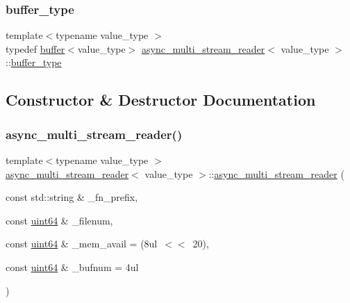 \subsubsection{\texorpdfstring{buffer\+\_\+type}{buffer\_type}}
{\footnotesize\ttfamily template$<$typename value\+\_\+type $>$ \\
typedef \hyperlink{structbuffer}{buffer}$<$value\+\_\+type$>$ \hyperlink{classasync__multi__stream__reader}{async\+\_\+multi\+\_\+stream\+\_\+reader}$<$ value\+\_\+type $>$\+::\hyperlink{classasync__multi__stream__reader_ad58ad834dc6d741a12be1fb442b8e5d6}{buffer\+\_\+type}\hspace{0.3cm}{\ttfamily [private]}}



\subsection{Constructor \& Destructor Documentation}
\mbox{\label{classasync__multi__stream__reader_af83e5faafb7612b51abc05e8edde52dd}} 
\subsubsection{\texorpdfstring{async\+\_\+multi\+\_\+stream\+\_\+reader()}{async\_multi\_stream\_reader()}}
{\footnotesize\ttfamily template$<$typename value\+\_\+type $>$ \\
\hyperlink{classasync__multi__stream__reader}{async\+\_\+multi\+\_\+stream\+\_\+reader}$<$ value\+\_\+type $>$\+::\hyperlink{classasync__multi__stream__reader}{async\+\_\+multi\+\_\+stream\+\_\+reader} (\begin{DoxyParamCaption}\item[{const std\+::string \&}]{\+\_\+fn\+\_\+prefix,  }\item[{const \hyperlink{types_8h_a60e8696a4678cd348e991a1f172e53f7}{uint64} \&}]{\+\_\+filenum,  }\item[{const \hyperlink{types_8h_a60e8696a4678cd348e991a1f172e53f7}{uint64} \&}]{\+\_\+mem\+\_\+avail = {\ttfamily (8ul~$<$$<$~20)},  }\item[{const \hyperlink{types_8h_a60e8696a4678cd348e991a1f172e53f7}{uint64} \&}]{\+\_\+bufnum = {\ttfamily 4ul} }\end{DoxyParamCaption})\hspace{0.3cm}{\ttfamily [inline]}}



